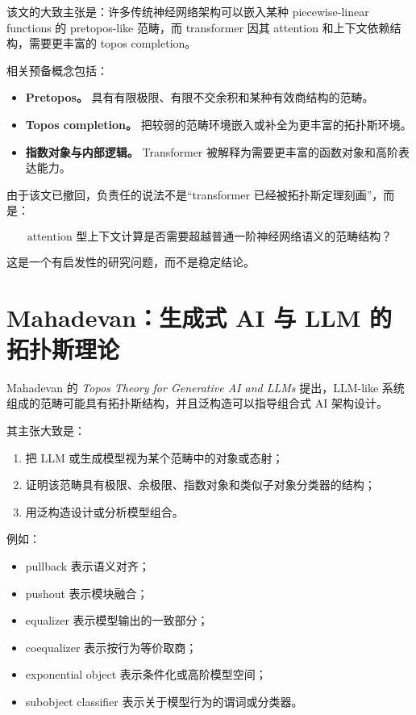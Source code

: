 \documentclass[UTF8,11pt,fontset=none]{ctexart}
\begin{document}
该文的大致主张是：许多传统神经网络架构可以嵌入某种 piecewise-linear functions 的 pretopos-like 范畴，而 transformer 因其 attention 和上下文依赖结构，需要更丰富的 topos completion。


相关预备概念包括：


\begin{itemize}
\item \textbf{Pretopos。} 具有有限极限、有限不交余积和某种有效商结构的范畴。
\item \textbf{Topos completion。} 把较弱的范畴环境嵌入或补全为更丰富的拓扑斯环境。
\item \textbf{指数对象与内部逻辑。} Transformer 被解释为需要更丰富的函数对象和高阶表达能力。
\end{itemize}

由于该文已撤回，负责任的说法不是“transformer 已经被拓扑斯定理刻画”，而是：


\[
\text{attention 型上下文计算是否需要超越普通一阶神经网络语义的范畴结构？}
\]

这是一个有启发性的研究问题，而不是稳定结论。


\section{Mahadevan：生成式 AI 与 LLM 的拓扑斯理论}

Mahadevan 的 \emph{Topos Theory for Generative AI and LLMs} 提出，LLM-like 系统组成的范畴可能具有拓扑斯结构，并且泛构造可以指导组合式 AI 架构设计。


其主张大致是：


\begin{enumerate}
\item 把 LLM 或生成模型视为某个范畴中的对象或态射；
\item 证明该范畴具有极限、余极限、指数对象和类似子对象分类器的结构；
\item 用泛构造设计或分析模型组合。
\end{enumerate}

例如：


\begin{itemize}
\item pullback 表示语义对齐；
\item pushout 表示模块融合；
\item equalizer 表示模型输出的一致部分；
\item coequalizer 表示按行为等价取商；
\item exponential object 表示条件化或高阶模型空间；
\item subobject classifier 表示关于模型行为的谓词或分类器。
\end{itemize}
\end{document}
